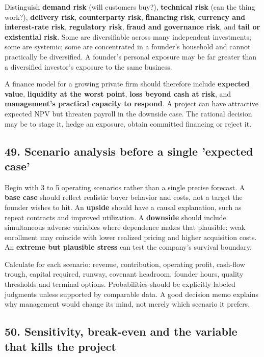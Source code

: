 Distinguish \textbf{demand risk} (will customers buy?), \textbf{technical risk} (can the thing work?), \textbf{delivery risk}, \textbf{counterparty risk}, \textbf{financing risk}, \textbf{currency and interest-rate risk}, \textbf{regulatory risk}, \textbf{fraud and governance risk}, and \textbf{tail or existential risk}. Some are diversifiable across many independent investments; some are systemic; some are concentrated in a founder's household and cannot practically be diversified. A founder's personal exposure may be far greater than a diversified investor's exposure to the same business.

A finance model for a growing private firm should therefore include \textbf{expected value}, \textbf{liquidity at the worst point}, \textbf{loss beyond cash at risk}, and \textbf{management's practical capacity to respond}. A project can have attractive expected NPV but threaten payroll in the downside case. The rational decision may be to stage it, hedge an exposure, obtain committed financing or reject it.

\subsection{49. Scenario analysis before a single 'expected case'}


Begin with 3 to 5 operating scenarios rather than a single precise forecast. A \textbf{base case} should reflect realistic buyer behavior and costs, not a target the founder wishes to hit. An \textbf{upside} should have a causal explanation, such as repeat contracts and improved utilization. A \textbf{downside} should include simultaneous adverse variables where dependence makes that plausible: weak enrollment may coincide with lower realized pricing and higher acquisition costs. An \textbf{extreme but plausible stress} can test the company's survival boundary.

Calculate for each scenario: revenue, contribution, operating profit, cash-flow trough, capital required, runway, covenant headroom, founder hours, quality thresholds and terminal options. Probabilities should be explicitly labeled judgments unless supported by comparable data. A good decision memo explains why management would change its mind, not merely which scenario it prefers.

\subsection{50. Sensitivity, break-even and the variable that kills the project}


